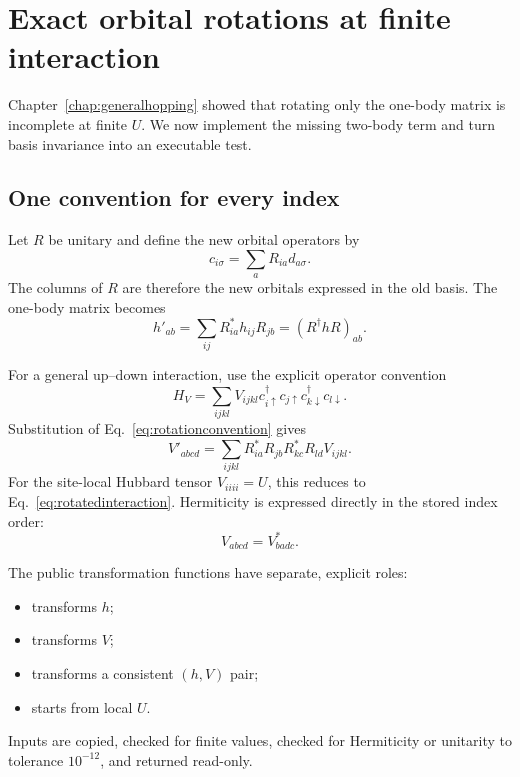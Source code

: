\chapter{Exact orbital rotations at finite interaction}
\label{chap:orbitalrotations}

Chapter~\ref{chap:generalhopping} showed that rotating only the one-body
matrix is incomplete at finite $U$.  We now implement the missing two-body
term and turn basis invariance into an executable test.

\section{One convention for every index}

Let $R$ be unitary and define the new orbital operators by
\begin{equation}
c_{i\sigma}=\sum_a R_{ia}d_{a\sigma}.
\label{eq:rotationconvention}
\end{equation}
The columns of $R$ are therefore the new orbitals expressed in the old basis.
The one-body matrix becomes
\begin{equation}
h'_{ab}=\sum_{ij}R^*_{ia}h_{ij}R_{jb}
       =\left(R^\dagger hR\right)_{ab}.
\end{equation}

For a general up--down interaction, use the explicit operator convention
\begin{equation}
H_V=\sum_{ijkl}V_{ijkl}
c_{i\uparrow}^\dagger c_{j\uparrow}
c_{k\downarrow}^\dagger c_{l\downarrow}.
\end{equation}
Substitution of Eq.~\eqref{eq:rotationconvention} gives
\begin{equation}
V'_{abcd}=\sum_{ijkl}
R^*_{ia}R_{jb}R^*_{kc}R_{ld}V_{ijkl}.
\label{eq:generaltensorrotation}
\end{equation}
For the site-local Hubbard tensor $V_{iiii}=U$, this reduces to
Eq.~\eqref{eq:rotatedinteraction}.  Hermiticity is expressed directly in the
stored index order:
\begin{equation}
V_{abcd}=V^*_{badc}.
\end{equation}

The public transformation functions have separate, explicit roles:
\begin{itemize}
\item {} transforms $h$;
\item {} transforms $V$;
\item {} transforms a consistent $(h,V)$ pair;
\item {} starts from local $U$.
\end{itemize}
Inputs are copied, checked for finite values, checked for Hermiticity or
unitarity to tolerance $10^{-12}$, and returned read-only.

